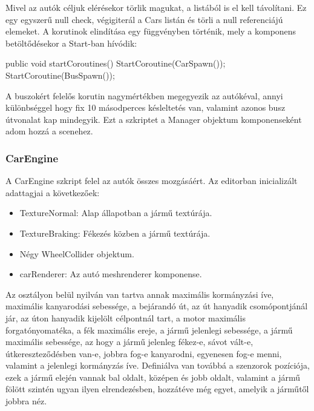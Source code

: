 Mivel az autók céljuk elérésekor törlik magukat, a listából is el kell távolítani. Ez egy egyszerű null check, végigiterál a Cars listán és törli a null referenciájú elemeket.
A korutinok elindítása egy függvényben történik, mely a komponens betöltődésekor a Start-ban hívódik:
\begin{cpp}
public void startCoroutines()
        {
            StartCoroutine(CarSpawn());
            StartCoroutine(BusSpawn());
        }
\end{cpp}
A buszokért felelős korutin nagymértékben megegyezik az autókéval, annyi különbséggel hogy fix 10 másodperces késleltetés van, valamint azonos busz útvonalat kap mindegyik.
Ezt a szkriptet a Manager objektum komponenseként adom hozzá a scenehez.
\subsubsection{CarEngine}
A CarEngine szkript felel az autók összes mozgásáért. Az editorban inicializált adattagjai a következőek:
\begin{itemize}
\item{TextureNormal: Alap állapotban a jármű textúrája.}
\item{TextureBraking: Fékezés közben a jármű textúrája.}
\item{Négy WheelCollider objektum.}
\item{carRenderer: Az autó meshrenderer komponense.}
\end{itemize}
Az osztályon belül nyilván van tartva annak maximális kormányzási íve, maximális kanyarodási sebessége, a bejárandó út, az út hanyadik csomópontjánál jár, az úton hanyadik kijelölt célpontnál tart, a motor maximális forgatónyomatéka, a fék maximális ereje, a jármű jelenlegi sebessége, a jármű maximális sebessége, az hogy a jármű jelenleg fékez-e, sávot vált-e, útkereszteződésben van-e, jobbra fog-e kanyarodni, egyenesen fog-e menni, valamint a jelenlegi kormányzás íve.
Definiálva van továbbá a szenzorok pozíciója, ezek a jármű elején vannak bal oldalt, középen és jobb oldalt, valamint a jármű fölött szintén ugyan ilyen elrendezésben, hozzátéve még egyet, amelyik a járműtől jobbra néz.

